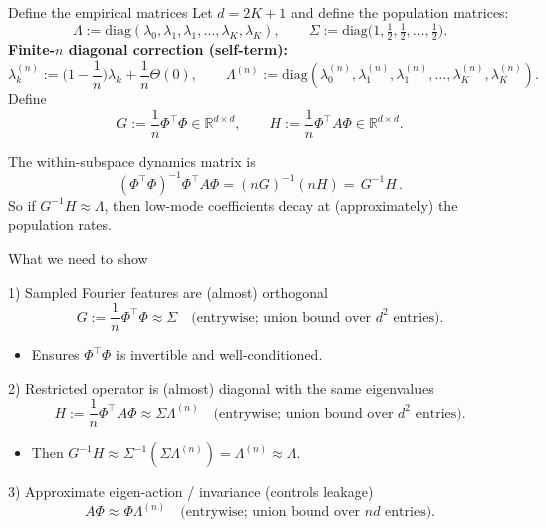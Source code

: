 \documentclass[10pt,aspectratio=169]{beamer}
\newcommand{\R}{\mathbb{R}}
\begin{document}
\begin{frame}{Define the empirical matrices}
	Let $d=2K+1$ and define the population matrices:
	\[
		\Lambda:=\mathrm{diag}(\lambda_0,\lambda_1,\lambda_1,\dots,\lambda_K,\lambda_K),
		\qquad
		\Sigma:=\mathrm{diag}\!\Big(1,\tfrac12,\tfrac12,\dots,\tfrac12\Big).
	\]
	\textbf{Finite-$n$ diagonal correction (self-term):}
	\[
		\lambda_k^{(n)}:=\Big(1-\frac1n\Big)\lambda_k+\frac1n\Theta(0),
		\qquad
		\Lambda^{(n)}:=\mathrm{diag}(\lambda_0^{(n)},\lambda_1^{(n)},\lambda_1^{(n)},\dots,\lambda_K^{(n)},\lambda_K^{(n)}).
	\]
	Define
	\[
		\boxed{
			G:=\frac{1}{n}\Phi^\top\Phi\in\R^{d\times d},
			\qquad
			H:=\frac{1}{n}\Phi^\top A\Phi\in\R^{d\times d}.
		}
	\]

	The within-subspace dynamics matrix is
	\[
		(\Phi^\top\Phi)^{-1}\Phi^\top A\Phi
		=(nG)^{-1}(nH)=\boxed{\,G^{-1}H\,}.
	\]
	So if $G^{-1}H \approx \Lambda$, then low-mode coefficients decay at (approximately) the population rates.

\end{frame}

\begin{frame}{What we need to show}
	\small

	\begin{block}{1) Sampled Fourier features are (almost) orthogonal}
		\[
			G:=\frac1n\Phi^\top\Phi \approx \Sigma
			\quad\text{(entrywise; union bound over $d^2$ entries).}
		\]
		\vspace{-2em}
		\begin{itemize}
			\item Ensures $\Phi^\top\Phi$ is invertible and well-conditioned.
		\end{itemize}
	\end{block}

	\begin{block}{2) Restricted operator is (almost) diagonal with the same eigenvalues}
		\[
			H:=\frac1n\Phi^\top A\Phi \approx \Sigma\Lambda^{(n)}
			\quad\text{(entrywise; union bound over $d^2$ entries).}
		\]
		\vspace{-2em}
		\begin{itemize}
			\item Then $G^{-1}H \approx \Sigma^{-1}(\Sigma\Lambda^{(n)})=\Lambda^{(n)}\approx \Lambda$.
		\end{itemize}
	\end{block}
	\vspace{-1em}
	\begin{block}{3) Approximate eigen-action / invariance (controls leakage)}
		\[
			A\Phi \approx \Phi\Lambda^{(n)}
			\quad\text{(entrywise; union bound over $nd$ entries).}
		\]
	\end{block}

\end{frame}
\end{document}
